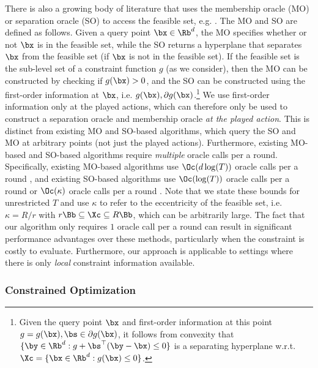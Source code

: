 There is also a growing body of literature that uses the membership oracle (MO) or separation oracle (SO) to access the feasible set, e.g. \citep{levy2019projection,garber2022new,mhammedi2022efficient,lu2023projection,hu2024riemannian,mhammedi2024online}.
The MO and SO are defined as follows.
Given a query point $\bx \in \Rb^d$, the MO specifies whether or not $\bx$ is in the feasible set, while the SO returns a hyperplane that separates $\bx$ from the feasible set (if $\bx$ is not in the feasible set).
If the feasible set is the sub-level set of a constraint function $g$ (as we consider), then the MO can be constructed by checking if $g(\bx) > 0$, and the SO can be constructed using the first-order information at $\bx$, i.e. $g(\bx),\partial g(\bx)$.\footnote{Given the query point $\bx$ and first-order information at this point $g = g(\bx),\bs \in \partial g(\bx)$, it follows from convexity that $\{ \by \in \Rb^d : g + \bs^\top(\by - \bx) \leq 0\}$ is a separating hyperplane w.r.t. $\Xc = \{ \bx \in \Rb^d : g(\bx) \leq 0 \}$.}
We use first-order information only at the played actions, which can therefore only be used to construct a separation oracle and membership oracle \emph{at the played action}.
This is distinct from existing MO and SO-based algorithms, which query the SO and MO at arbitrary points (not just the played actions).
Furthermore, existing MO-based and SO-based algorithms require \emph{multiple} oracle calls per a round.
Specifically, existing MO-based algorithms use $\Oc(d \log(T))$ oracle calls per a round \cite{lu2023projection,mhammedi2022efficient}, and existing SO-based algorithms use $\Oc(\log(T))$ oracle calls per a round \cite{mhammedi2022efficient,mhammedi2024online} or $\Oc(\kappa)$ oracle calls per a round \cite{garber2022new}.
Note that we state these bounds for unrestricted $T$ and use $\kappa$ to refer to the eccentricity of the feasible set, i.e. $\kappa = R/r$ with $r \Bb \subseteq \Xc \subseteq R \Bb$, which can be arbitrarily large.
The fact that our algorithm only requires $1$ oracle call per a round can result in significant performance advantages over these methods, particularly when the constraint is costly to evaluate.
Furthermore, our approach is applicable to settings where there is only \emph{local} constraint information available.

\subsubsection{Constrained Optimization}

